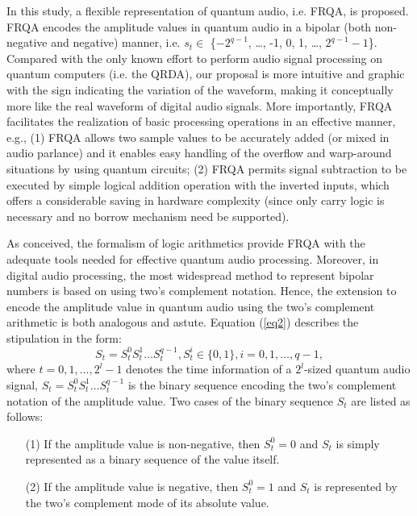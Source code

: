 \documentclass[10pt,journal,compsoc]{IEEEtran}
\begin{document}
In this study, a flexible representation of quantum audio, i.e. FRQA, is proposed. FRQA encodes the amplitude values in quantum audio in a bipolar (both non-negative and negative) manner, i.e. $s_t \in$ \{$-2^{q-1}$, \ldots, -1, 0, 1, \ldots, $2^{q-1}-1$\}. Compared with the only known effort to perform audio signal processing on quantum computers (i.e. the QRDA), our proposal is more intuitive and graphic with the sign indicating the variation of the waveform, making it conceptually more like the real waveform of digital audio signals. More importantly, FRQA facilitates the realization of basic processing operations in an effective manner, e.g., (1) FRQA allows two sample values to be accurately added (or mixed in audio parlance) and it enables easy handling of the overflow and warp-around situations by using quantum circuits; (2) FRQA permits signal subtraction to be executed by simple logical addition operation with the inverted inputs, which offers a considerable saving in hardware complexity (since only carry logic is necessary and no borrow mechanism need be supported).

As conceived, the formalism of logic arithmetics provide FRQA with the adequate tools needed for effective quantum audio processing. Moreover, in digital audio processing, the most widespread method to represent bipolar numbers is based on using two's complement notation. Hence, the extension to encode the amplitude value in quantum audio using the two's complement arithmetic is both analogous and astute. Equation (\ref{eq2}) describes the stipulation in the form:
\begin{equation}\label{eq2}
S_t = S_t^0S_t^1\ldots S_t^{q-1}, S_t^i\in\{0, 1\}, i = 0,1,\ldots,q-1,
\end{equation}
where $t = 0, 1, \ldots, 2^l-1$ denotes the time information of a $2^l$-sized quantum audio signal, $S_t = S_t^0S_t^1\ldots S_t^{q-1}$ is the binary sequence encoding the two's complement notation of the amplitude value. Two cases of the binary sequence $S_t$ are listed as follows:
\begin{itemize}
  \item[(1)] If the amplitude value is non-negative, then $S_t^0 = 0$ and $S_t$ is simply represented as a binary sequence of the value itself.
  \item[(2)] If the amplitude value is negative, then $S_t^0 = 1$ and $S_t$ is represented by the two's complement mode of its absolute value.
\end{itemize}
\end{document}
